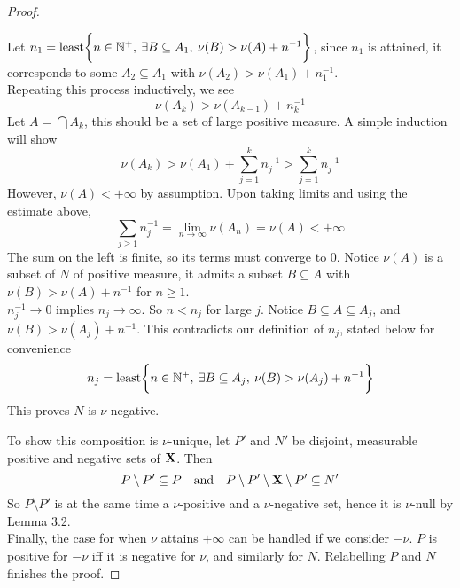 \documentclass[../../main.tex]{subfiles}
\begin{document}
\begin{proof}
\begin{itemize}
        Let $n_1 = \operatorname{least}\biggl\{{n\in\mathbb{N}^+,\: \exists B\subseteq A_1,\: \nu(B)>\nu(A)+n^{-1}}\biggr\}$, since $n_1$ is attained, it corresponds to some $A_2\subseteq A_1$ with $\nu(A_2)>\nu(A_1)+n_1^{-1}$.\\

        Repeating this process inductively, we see
        \[
            \nu(A_k)>\nu(A_{k-1}) + n^{-1}_{k}
        \]
        Let $A = \bigcap A_k$, this should be a set of large positive measure. A simple induction will show 
        \[
            \nu(A_k)>\nu(A_1) + \sum_{j=1}^k n^{-1}_{j}>\sum_{j=1}^k n^{-1}_{j}
        \]
        However, $\nu(A)<+\infty$ by assumption. Upon taking limits and using the estimate above,
        \[
            \sum_{j\geq 1} n^{-1}_{j}=\lim_{n\to\infty}\nu(A_n) = \nu(A)<+\infty
        \]
        The sum on the left is finite, so its terms must converge to $0$. Notice $\nu(A)$ is a subset of $N$ of positive measure, it admits a subset $B\subseteq A$ with $\nu(B)>\nu(A)+n^{-1}$ for $n\geq 1$.\\

        $n_j^{-1}\to 0$ implies $n_j\to\infty$. So $n<n_j$ for large $j$. Notice $B\subseteq A\subseteq A_j$, and $\nu(B)>\nu(A_j)+n^{-1}$. This contradicts our definition of $n_j$, stated below for convenience
        \[
            n_j = \operatorname{least}\biggl\{{n\in\mathbb{N}^+,\: \exists B\subseteq A_j,\: \nu(B)>\nu(A_j)+n^{-1}}\biggr\}
        \]
        This proves $N$ is $\nu$-negative.
    \end{itemize}
    To show this composition is $\nu$-unique, let $P'$ and $N'$ be disjoint, measurable positive and negative sets of ${\mathbf{X}}$. Then
    \[
        P\setminus P'\subseteq P\qqtext{and}P\setminus P'\setminus \xx\setminus P'\subseteq N'
    \]
    So $P\setminus P'$ is at the same time a $\nu$-positive and a $\nu$-negative set, hence it is $\nu$-null by Lemma 3.2.\\

    Finally, the case for when $\nu$ attains $+\infty$ can be handled if we consider $-\nu$. $P$ is positive for $-\nu$ iff it is negative for $\nu$, and similarly for $N$. Relabelling $P$ and $N$ finishes the proof.
\end{proof}
\end{document}
